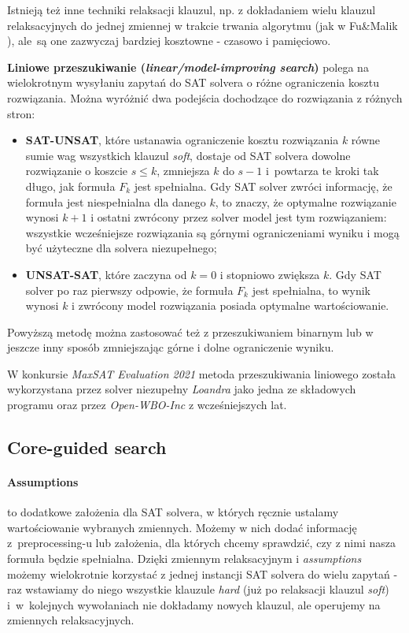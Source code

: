 \documentclass[shortabstract]{iithesis}
\begin{document}
Istnieją też inne techniki relaksacji klauzul, np. z dokładaniem wielu klauzul relaksacyjnych do jednej zmiennej w trakcie trwania algorytmu (jak w Fu\&Malik \cite{fumalik}), ale~są one zazwyczaj bardziej kosztowne - czasowo i pamięciowo.


\textbf{Liniowe przeszukiwanie (\textit{linear/model-improving search})} polega na wielokrotnym wysyłaniu zapytań do SAT solvera o różne ograniczenia kosztu rozwiązania. Można wyróżnić dwa podejścia dochodzące do rozwiązania z różnych stron:
\begin{itemize}
	\item \textbf{SAT-UNSAT}, które ustanawia ograniczenie kosztu rozwiązania $k$ równe sumie wag wszystkich klauzul \textit{soft}, dostaje od SAT solvera dowolne rozwiązanie o koszcie $s \le k$, zmniejsza $k$ do $s - 1$ i~powtarza te kroki tak długo, jak formuła $F_k$ jest spełnialna. Gdy SAT solver zwróci informację, że formuła jest niespełnialna dla danego $k$, to znaczy, że optymalne rozwiązanie wynosi $k + 1$ i ostatni zwrócony przez solver model jest tym rozwiązaniem: wszystkie wcześniejsze rozwiązania są górnymi ograniczeniami wyniku i mogą być użyteczne dla solvera niezupełnego;
	\item \textbf{UNSAT-SAT}, które zaczyna od $k = 0$ i stopniowo zwiększa $k$. Gdy SAT solver po raz pierwszy odpowie, że formuła $F_k$ jest spełnialna, to wynik wynosi $k$ i zwrócony model rozwiązania posiada optymalne wartościowanie.
\end{itemize}
Powyższą metodę można zastosować też z przeszukiwaniem binarnym lub w jeszcze inny sposób zmniejszając górne i dolne ograniczenie wyniku.

W konkursie \textit{MaxSAT Evaluation 2021} metoda przeszukiwania liniowego została wykorzystana przez solver niezupełny \textit{Loandra} \cite{coreboosted} jako jedna ze składowych programu oraz przez  \textit{Open-WBO-Inc} z wcześniejszych lat.

\subsection{Core-guided search}
\paragraph{Assumptions \cite{chapter24}} to dodatkowe założenia dla SAT solvera, w których ręcznie ustalamy wartościowanie wybranych zmiennych. Możemy w nich dodać informację z~preprocessing-u lub założenia, dla których chcemy sprawdzić, czy z nimi nasza formuła będzie spełnialna. Dzięki zmiennym relaksacyjnym i \textit{assumptions} możemy wielokrotnie korzystać z jednej instancji SAT solvera do wielu zapytań - raz wstawiamy do niego wszystkie klauzule \textit{hard} (już po relaksacji klauzul \textit{soft}) i~w~kolejnych wywołaniach nie dokładamy nowych klauzul, ale operujemy na zmiennych relaksacyjnych. 
\end{document}
